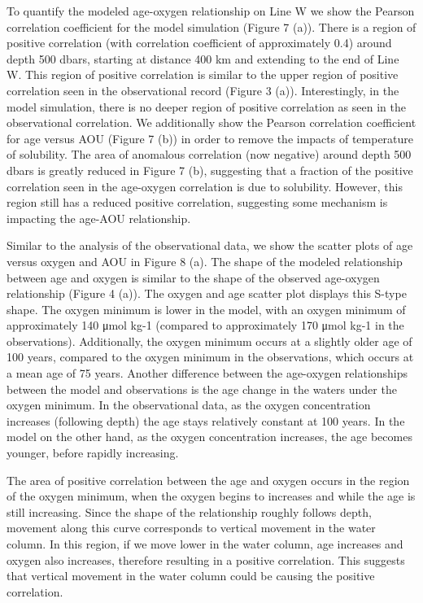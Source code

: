 \documentclass{ametsoc}
\begin{document}
To quantify the modeled age-oxygen relationship on Line W we show the Pearson correlation coefficient for the model simulation (Figure 7 (a)). There is a region of positive correlation (with correlation coefficient of approximately 0.4) around depth 500 dbars, starting at distance 400 km and extending to the end of Line W. This region of positive correlation is similar to the upper region of positive correlation seen in the observational record (Figure 3 (a)). Interestingly, in the model simulation, there is no deeper region of positive correlation as seen in the observational correlation. We additionally show the Pearson correlation coefficient for age versus AOU (Figure 7 (b)) in order to remove the impacts of temperature of solubility. The area of anomalous correlation (now negative) around depth 500 dbars is greatly reduced in Figure 7 (b), suggesting that a fraction of the positive correlation seen in the age-oxygen correlation is due to solubility. However, this region still has a reduced positive correlation, suggesting some mechanism is impacting the age-AOU relationship.

Similar to the analysis of the observational data, we show the scatter plots of age versus oxygen and AOU in Figure 8 (a). The shape of the modeled relationship between age and oxygen is similar to the shape of the observed age-oxygen relationship (Figure 4 (a)).  The oxygen and age scatter plot displays this S-type shape. The oxygen minimum is lower in the model, with an oxygen minimum of approximately 140 μmol kg-1 (compared to approximately 170 μmol kg-1 in the observations). Additionally, the oxygen minimum occurs at a slightly older age of 100 years, compared to the oxygen minimum in the observations, which occurs at a mean age of 75 years. Another difference between the age-oxygen relationships between the model and observations is the age change in the waters under the oxygen minimum. In the observational data, as the oxygen concentration increases (following depth) the age stays relatively constant at 100 years. In the model on the other hand, as the oxygen concentration increases, the age becomes younger, before rapidly increasing.

The area of positive correlation between the age and oxygen occurs in the region of the oxygen minimum, when the oxygen begins to increases and while the age is still increasing. Since the shape of the relationship roughly follows depth, movement along this curve corresponds to vertical movement in the water column. In this region, if we move lower in the water column, age increases and oxygen also increases, therefore resulting in a positive correlation. This suggests that vertical movement in the water column could be causing the positive correlation.
\end{document}
